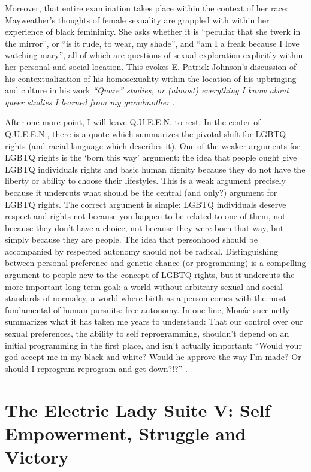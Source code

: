 \documentclass[a4paper, 11pt]{article} %
\begin{document}
Moreover, that entire examination takes place within the context of her race: Mayweather's thoughts of female sexuality are grappled with within her experience of black femininity.
She asks whether it is ``peculiar that she twerk in the mirror'', or ``is it rude, to wear, my shade'', and ``am I a freak because I love watching mary'', all of which are questions of sexual exploration explicitly within her personal and social location.
This evokes E. Patrick Johnson's discussion of his contextualization of his homosexuality within the location of his upbringing and culture in his work \emph{``Quare'' studies, or (almost) everything I know about queer studies I learned from my grandmother} \cite{johnson2001quare}.

After one more point, I will leave Q.U.E.E.N. to rest.
In the center of Q.U.E.E.N., there is a quote which summarizes the pivotal shift for LGBTQ rights (and racial language which describes it).
One of the weaker arguments for LGBTQ rights is the `born this way' argument: the idea that people ought give LGBTQ individuals rights and basic human dignity because they do not have the liberty or ability to choose their lifestyles.
This is a weak argument precisely because it undercuts what should be the central (and only?) argument for LGBTQ rights.
The correct argument is simple: LGBTQ individuals deserve respect and rights not because you happen to be related to one of them, not because they don't have a choice, not because they were born that way, but simply because they are people.
The idea that personhood should be accompanied by respected autonomy should not be radical.
Distinguishing between personal preference and genetic chance (or programming) is a compelling argument to people new to the concept of LGBTQ rights, but it undercuts the more important long term goal: a world without arbitrary sexual and social standards of normalcy, a world where birth as a person comes with the most fundamental of human pursuits: free autonomy. 
In one line, Mon\'ae succinctly summarizes what it has taken me years to understand: That our control over our sexual preferences, the ability to self reprogramming, shouldn't depend on an initial programming in the first place, and isn't actually important:
``Would your god accept me in my black and white? Would he approve the way I'm made? Or should I reprogram reprogram and get down?!?'' \cite{queen}.



\section*{The Electric Lady Suite V: Self Empowerment, Struggle and Victory}
\end{document}
